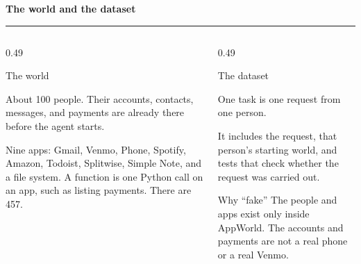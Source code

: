 \documentclass[aspectratio=169,11pt]{beamer}
\begin{document}
\begin{frame}
\vspace*{-4pt}
\begin{center}
  {\Large\bfseries\color{deepblue} The world and the dataset}\\[1pt]
  {\color{accent}\rule{0.32\linewidth}{1.1pt}}
\end{center}

\vspace{0.12em}
\begin{columns}[T]
\begin{column}{0.49\textwidth}
\begin{stepbox}{The world}
\raggedright
About 100 people. Their accounts, contacts, messages, and payments are already there before the agent starts.

\vspace{0.15em}
Nine apps: Gmail, Venmo, Phone, Spotify, Amazon, Todoist, Splitwise, Simple Note, and a file system. A function is one Python call on an app, such as listing payments. There are 457.
\end{stepbox}
\end{column}
\begin{column}{0.49\textwidth}
\begin{stepbox}{The dataset}
\raggedright
One task is one request from one person.

\vspace{0.3em}
It includes the request, that person's starting world, and tests that check whether the request was carried out.
\end{stepbox}

\vspace{0.35em}
\begin{stepbox}{Why ``fake''}
The people and apps exist only inside AppWorld. The accounts and payments are not a real phone or a real Venmo.
\end{stepbox}
\end{column}
\end{columns}
\end{frame}
\end{document}
